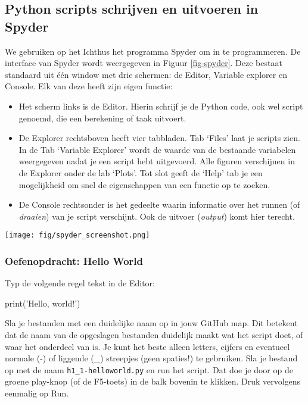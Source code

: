 \documentclass[a4paper,11pt, fleqn]{article}
\begin{document}
\subsection{Python scripts schrijven en uitvoeren in Spyder}
We gebruiken op het Ichthus het programma Spyder om in te programmeren. De interface van Spyder wordt weergegeven in Figuur \ref{fig-spyder}. Deze bestaat standaard uit \'e\'en window met drie schermen: de Editor, Variable explorer en Console. Elk van deze heeft zijn eigen functie:
\begin{itemize}
\item[-] Het scherm links is de Editor. Hierin schrijf je de Python code, ook wel script genoemd, die een berekening of taak uitvoert. 
\item[-] De Explorer rechtsboven heeft vier tabbladen. Tab `Files' laat je scripts zien. In de Tab `Variable Explorer' wordt de waarde van de bestaande variabelen weergegeven nadat je een script hebt uitgevoerd. Alle figuren verschijnen in de Explorer onder de lab `Plots'. Tot slot geeft de `Help' tab je een mogelijkheid om snel de eigenschappen van een functie op te zoeken.
\item[-] De Console rechtsonder is het gedeelte waarin informatie over het runnen (of \textit{draaien}) van je script verschijnt. Ook de uitvoer (\textit{output}) komt hier terecht.
\end{itemize}

\begin{figure*}[h]
\texttt{[image: fig/spyder\_screenshot.png]}
\caption{\it De interface van Spyder direct na het opstarten van het programma.}
\label{fig-spyder}
\end{figure*}

\subsubsection*{Oefenopdracht: Hello World} 
Typ de volgende regel tekst in de Editor: 
\begin{python}
print('Hello, world!')
\end{python}

Sla je bestanden met een duidelijke naam op in jouw GitHub map. Dit betekent dat de naam van de opgeslagen bestanden duidelijk maakt wat het script doet, of waar het onderdeel van is. Je kunt het beste alleen letters, cijfers en eventueel normale (-) of liggende (\_) streepjes (geen spaties!) te gebruiken. Sla je bestand op met de naam \verb,h1_1-helloworld.py, en run het script.  Dat doe je door op de groene play-knop (of de F5-toets) in de balk bovenin te klikken. Druk vervolgens eenmalig op Run.
\end{document}
